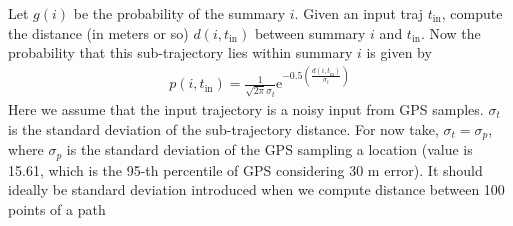 Let $g(i)$ be the probability of the summary $i$. Given an input traj $t_{\operatorname{in}}$, compute the distance (in meters or so) $d(i,t_{\operatorname{in}})$ between summary $i$ and $t_{\operatorname{in}}$. Now the probability that this sub-trajectory lies within summary $i$ is given by
\begin{eqnarray}
p(i,t_{\operatorname{in}}) = \frac{1}{\sqrt{2 \pi} \sigma_{t}} \mathrm{e}^{-0.5 \left( \frac{d(i,t_{\operatorname{in}})}{\sigma_{t}} \right)}
\end{eqnarray}
Here we assume that the input trajectory is a noisy input from GPS samples. $\sigma_{t}$ is the standard deviation of the sub-trajectory distance. For now take, $\sigma_{t} = \sigma_{p}$, where $\sigma_{p}$ is the standard deviation of the GPS sampling a location (value is 15.61, which is the 95-th percentile of GPS considering 30 m error). It should ideally be standard deviation introduced when we compute distance between 100 points of a path


